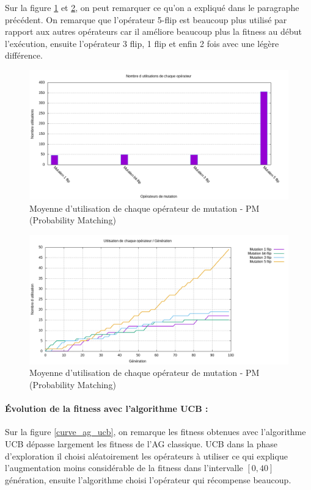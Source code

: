 \documentclass[12pt]{article}
\begin{document}
Sur la figure \ref{histogrammeOppm} et \ref{utilisation_op}, on peut remarquer ce qu'on a expliqué dans le paragraphe précédent. On remarque que l'opérateur 5-flip est beaucoup plus utilisé par rapport aux autres opérateurs car il améliore beaucoup plus la fitness au début l'exécution, ensuite l'opérateur 3 flip, 1 flip et enfin 2 fois avec une légère différence. 

\begin{figure}[H]
	\begin{center}
		\includegraphics[scale=0.5]{img/histogrammeOppm.png}
		\caption{Moyenne d'utilisation de chaque opérateur de mutation - PM (Probability Matching)}
		\label{histogrammeOppm}
	\end{center}
\end{figure}

\begin{figure}[H]
	\begin{center}
		\includegraphics[scale=0.5]{img/utilisation_op.png}
		\caption{Moyenne d'utilisation de chaque opérateur de mutation - PM (Probability Matching)}
		\label{utilisation_op}
	\end{center}
\end{figure}

\paragraph{Évolution de la fitness avec l'algorithme UCB : } Sur la figure \ref{curve_ag_ucb}, on remarque les fitness obtenues avec l'algorithme UCB dépasse largement les fitness de l'AG classique. UCB dans la phase d'exploration il choisi aléatoirement les opérateurs à utiliser ce qui explique l'augmentation moins considérable de la fitness dans l'intervalle $ [0, 40] $ génération, ensuite l'algorithme choisi l'opérateur qui récompense beaucoup.
\end{document}
